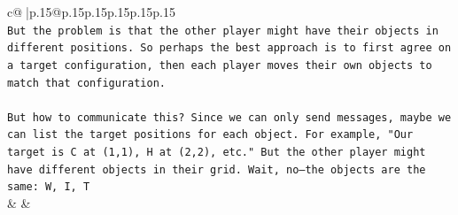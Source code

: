 \documentclass{article}
\begin{document}
{\begin{supertabular}{c@{$\;$}|p{.15\linewidth}@{}p{.15\linewidth}p{.15\linewidth}p{.15\linewidth}p{.15\linewidth}p{.15\linewidth}}
{{{\\ 
\texttt{But the problem is that the other player might have their objects in different positions. So perhaps the best approach is to first agree on a target configuration, then each player moves their own objects to match that configuration.} \\
\\ 
\texttt{But how to communicate this? Since we can only send messages, maybe we can list the target positions for each object. For example, "Our target is C at (1,1), H at (2,2), etc." But the other player might have different objects in their grid. Wait, no—the objects are the same: W, I, T} \\
            }
        }
    }
    & & \\ \\


\end{supertabular}}
\end{document}
